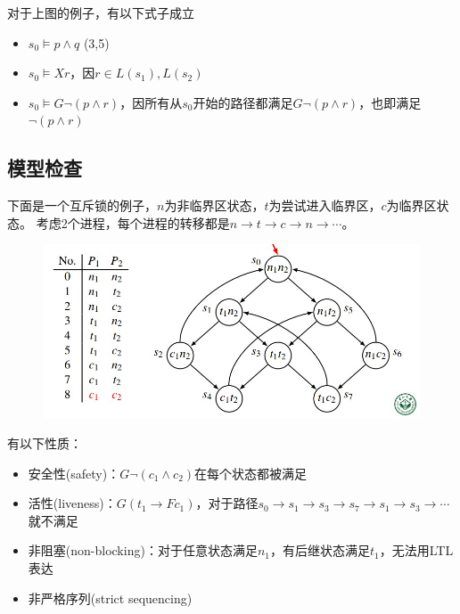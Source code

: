 \begin{example}
对于上图的例子，有以下式子成立
\begin{itemize}
	\item $s_0\models p\land q$ (3,5)
	\item $s_0\models X r$，因$r\in L(s_1),L(s_2)$
	\item $s_0\models G\lnot (p\land r)$，因所有从$s_0$开始的路径都满足$G\lnot(p\land r)$，也即满足$\lnot(p\land r)$
\end{itemize}
\end{example}

\subsection{模型检查}
下面是一个互斥锁的例子，$n$为非临界区状态，$t$为尝试进入临界区，$c$为临界区状态。
考虑2个进程，每个进程的转移都是$n\to t\to c\to n\to\cdots$。
\begin{figure}[H]
\centering
\includegraphics[width=0.8\linewidth]{fig/mutual_exclusion.jpg}
\end{figure}
有以下性质：
\begin{itemize}
	\item 安全性(safety)：$G\lnot(c_1\land c_2)$在每个状态都被满足
	\item 活性(liveness)：$G(t_1\to Fc_1)$，对于路径$s_0\to s_1\to s_3\to s_7\to s_1\to s_3\to\cdots$就不满足
	\item 非阻塞(non-blocking)：对于任意状态满足$n_1$，有后继状态满足$t_1$，无法用LTL表达
	\item 非严格序列(strict sequencing)
\end{itemize}

